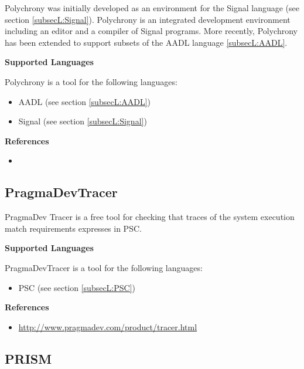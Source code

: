 Polychrony was initially developed as an environment for the Signal language (see section \ref{subsecL:Signal}). Polychrony is an integrated development environment including an editor and a compiler of Signal programs. More recently, Polychrony has been extended to support subsets of the AADL language \ref{subsecL:AADL}.

\textbf{Supported Languages}

Polychrony is a tool for the following languages:
\begin{itemize}
	\item AADL (see section \ref{subsecL:AADL})
	\item Signal (see section \ref{subsecL:Signal})
\end{itemize}


\textbf{References}
\begin{itemize}
	
\item {}
\end{itemize}



\subsection{PragmaDevTracer}
\label{subsecT:PragmaDevTracer}


PragmaDev Tracer is a free tool for checking that traces of the system execution match requirements expresses in PSC.

\textbf{Supported Languages}

PragmaDevTracer is a tool for the following languages:
\begin{itemize}
	\item PSC (see section \ref{subsecL:PSC})
\end{itemize}


\textbf{References}
\begin{itemize}
	
\item \url{http://www.pragmadev.com/product/tracer.html}
\end{itemize}



\subsection{PRISM}
\label{subsecT:PRISM}


